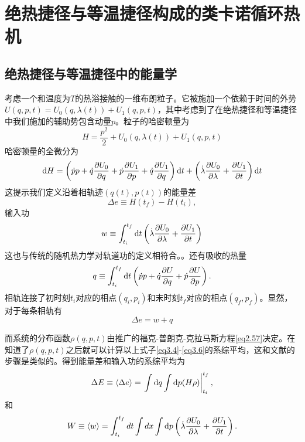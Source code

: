 \chapter{绝热捷径与等温捷径构成的类卡诺循环热机}
\section{绝热捷径与等温捷径中的能量学}

考虑一个和温度为$T$的热浴接触的一维布朗粒子。它被施加一个依赖于时间的外势$U(q,p,t) = U_0 (q,\lambda(t)) + U_1 (q,p,t)$，其中考虑到了在绝热捷径和等温捷径中我们施加的辅助势包含动量$p$。粒子的哈密顿量为
\begin{equation}
    H=\frac{p^{2}}{2}+U_0 (q,\lambda(t)) + U_1 (q,p,t)
    \label{eq3.1}
\end{equation}
哈密顿量的全微分为
\begin{equation}
    \mathrm{d} H=\left(\dot{p} p+\dot{q} \frac{\partial U_0}{\partial q} +  \dot{p} \frac{\partial U_1}{\partial p} + \dot{q} \frac{\partial U_1}{\partial q}  \right) \mathrm{d} t+\left(\dot{\lambda} \frac{\partial U_0}{\partial \lambda} + \frac{\partial U_1}{\partial t} \right) \mathrm{d} t
    \label{eq3.2}
\end{equation}
这提示我们定义沿着相轨迹$(q(t), p(t))$的能量差\cite{Tu2013}
\begin{equation}
     \Delta e \equiv H\left(t_{f}\right)-H\left(t_{i}\right),
     \label{eq3.3}
\end{equation}
输入功
\begin{equation}
    w \equiv \int_{t_{i}}^{t_{f}} \mathrm{d} t \left( \dot{\lambda} \frac{\partial U_0}{\partial \lambda} + \frac{\partial U_1}{\partial t} \right)
    \label{eq3.4}
\end{equation}
这也与传统的随机热力学对轨道功的定义相符合。\cite{Sekimoto2010,Jarzynski1997,Sekimoto_1997}。还有吸收的热量
\begin{equation}
    q \equiv \int_{t_{i}}^{t_{f}} \mathrm{d} t \left(\dot{p} p+\dot{q} \frac{\partial U}{\partial q} +  \dot{p} \frac{\partial U}{\partial p}\right).
    \label{eq3.5}
\end{equation}
相轨连接了初时刻$t_i$对应的相点$(q_i , p_i )$和末时刻$t_f$对应的相点$(q_f , p_f )$。显然，对于每条相轨有
\begin{equation}
    \Delta e = w + q
    \label{eq3.6}
\end{equation}

而系统的分布函数$\rho (q,p,t)$由推广的福克-普朗克-克拉马斯方程\eqref{eq2.57}决定。在知道了$\rho (q,p,t)$之后就可以计算以上式子\eqref{eq3.4}-\eqref{eq3.6}的系综平均，这和文献\cite{Seifert2005,Shizume1995,Bizarro2011}的步骤是类似的。得到能量差和输入功的系综平均为
\begin{equation}
    \Delta E \equiv\langle\Delta e\rangle=\left.\int \mathrm{d} q \int \mathrm{d} p(H \rho)\right|_{t_{i}} ^{t_{f}} ,
    \label{eq3.9}
\end{equation}
和
\begin{equation}
    W \equiv\langle w\rangle=\int_{t_{i}}^{t_{f}} d t \int d x \int \mathrm{d} p\left( \dot{\lambda} \frac{\partial U_0}{\partial \lambda} + \frac{\partial U_1}{\partial t} \right).
    \label{eq3.10}
\end{equation}

